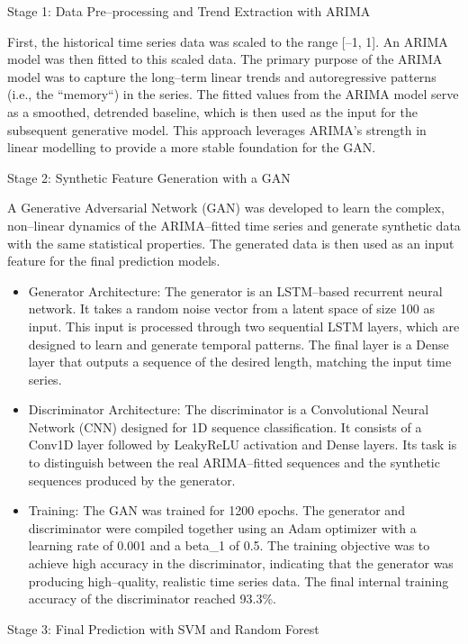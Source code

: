 \documentclass[12pt,a4paper]{report}
\numberwithin{equation}{section}
\begin{document}
Stage 1: Data Pre--processing and Trend Extraction with ARIMA

First, the historical time series data was scaled to the range {[}--1,
1{]}. An ARIMA model was then fitted to this scaled data. The primary
purpose of the ARIMA model was to capture the long--term linear trends
and autoregressive patterns (i.e., the ``memory``) in the series. The
fitted values from the ARIMA model serve as a smoothed, detrended
baseline, which is then used as the input for the subsequent generative
model. This approach leverages ARIMA's strength in linear modelling to
provide a more stable foundation for the GAN.

Stage 2: Synthetic Feature Generation with a GAN

A Generative Adversarial Network (GAN) was developed to learn the
complex, non--linear dynamics of the ARIMA--fitted time series and
generate synthetic data with the same statistical properties. The
generated data is then used as an input feature for the final prediction
models.

\begin{itemize}
\item
  Generator Architecture: The generator is an LSTM--based recurrent
  neural network. It takes a random noise vector from a latent space of
  size 100 as input. This input is processed through two sequential LSTM
  layers, which are designed to learn and generate temporal patterns.
  The final layer is a Dense layer that outputs a sequence of the
  desired length, matching the input time series.
\item
  Discriminator Architecture: The discriminator is a Convolutional
  Neural Network (CNN) designed for 1D sequence classification. It
  consists of a Conv1D layer followed by LeakyReLU activation and Dense
  layers. Its task is to distinguish between the real ARIMA--fitted
  sequences and the synthetic sequences produced by the generator.
\item
  Training: The GAN was trained for 1200 epochs. The generator and
  discriminator were compiled together using an Adam optimizer with a
  learning rate of 0.001 and a beta\_1 of 0.5. The training objective
  was to achieve high accuracy in the discriminator, indicating that the
  generator was producing high--quality, realistic time series data. The
  final internal training accuracy of the discriminator reached 93.3\%.
\end{itemize}

Stage 3: Final Prediction with SVM and Random Forest
\end{document}
